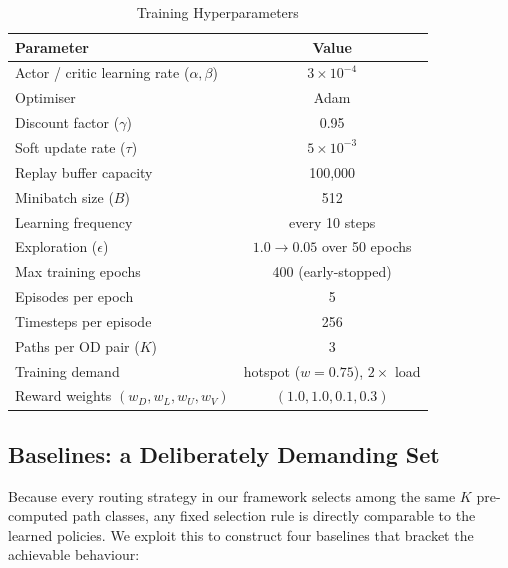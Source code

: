 \documentclass[10pt,journal,comsoc]{IEEEtran}
\begin{document}
\begin{table}[!t]
  \centering
  \caption{Training Hyperparameters}
  \label{tab:training_params}
  \begin{tabular}{lc}
    \toprule
    \textbf{Parameter} & \textbf{Value} \\
    \midrule
    Actor / critic learning rate ($\alpha,\beta$) & $3\times10^{-4}$ \\
    Optimiser & Adam \\
    Discount factor ($\gamma$) & 0.95 \\
    Soft update rate ($\tau$) & $5\times10^{-3}$ \\
    Replay buffer capacity & 100{,}000 \\
    Minibatch size ($B$) & 512 \\
    Learning frequency & every 10 steps \\
    Exploration ($\epsilon$) & $1.0 \rightarrow 0.05$ over 50 epochs \\
    Max training epochs & 400 (early-stopped) \\
    Episodes per epoch & 5 \\
    Timesteps per episode & 256 \\
    Paths per OD pair ($K$) & 3 \\
    Training demand & hotspot ($w=0.75$), $2\times$ load \\
    Reward weights $(w_D,w_L,w_U,w_V)$ & $(1.0,1.0,0.1,0.3)$ \\
    \bottomrule
  \end{tabular}
\end{table}

\subsection{Baselines: a Deliberately Demanding Set}
\label{subsec:baselines}
Because every routing strategy in our framework selects among the same $K$ pre-computed path classes, any fixed selection rule is directly comparable to the learned policies. We exploit this to construct four baselines that bracket the achievable behaviour:
\end{document}
